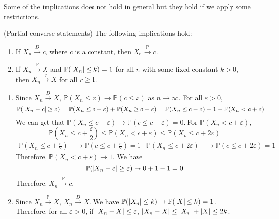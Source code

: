 \documentclass{huhtakm-template-book}
\newcommand{\prob}{\mathbb{P}}
\begin{document}
Some of the implications does not hold in general but they hold if we apply some restrictions.
\begin{thm}(Partial converse statements)
	\label{Chapter 8 (Theorem) Partial converse statements}
	The following implications hold:
	\begin{enumerate}
		\item If $X_{n}\xrightarrow{D}c$, where $c$ is a constant, then $X_{n}\xrightarrow{\prob}c$.
		\item If $X_{n}\xrightarrow{\prob}X$ and $\prob(\abs{X_{n}}\leq k)=1$ for all $n$ with some fixed constant $k>0$, then $X_{n}\xrightarrow{r}X$ for all $r\geq 1$.
	\end{enumerate}
\end{thm}
\begin{proofing}
	\begin{enumerate}
		\item Since $X_{n}\xrightarrow{D}X$, $\prob(X_{n}\leq x)\to\prob(c\leq x)$ as $n\to\infty$. For all $\varepsilon>0$,
		\begin{equation*}
			\prob(\abs{X_{n}-c}\geq\varepsilon)=\prob(X_{n}\leq c-\varepsilon)+\prob(X_{n}\geq c+\varepsilon)=\prob(X_{n}\leq c-\varepsilon)+1-\prob(X_{n}<c+\varepsilon)
		\end{equation*}
		We can get that $\prob(X_{n}\leq c-\varepsilon)\to\prob(c\leq c-\varepsilon)=0$. For $\prob(X_{n}<c+\varepsilon)$,
		\begin{equation*}
			\prob\left(X_{n}\leq c+\frac{\varepsilon}{2}\right)\leq\prob(X_{n}<c+\varepsilon)\leq\prob(X_{n}\leq c+2\varepsilon)
		\end{equation*}
		\begin{align*}
			\prob\left(X_{n}\leq c+\frac{\varepsilon}{2}\right)&\to\prob\left(c\leq c+\frac{\varepsilon}{2}\right)=1 & \prob(X_{n}\leq c+2\varepsilon)&\to\prob(c\leq c+2\varepsilon)=1
		\end{align*}
		Therefore, $\prob(X_{n}<c+\varepsilon)\to 1$. We have
		\begin{equation*}
			\prob(\abs{X_{n}-c}\geq\varepsilon)\to 0+1-1 = 0
		\end{equation*}
		Therefore, $X_{n}\xrightarrow{\prob}c$.
		\item Since $X_{n}\xrightarrow{\prob}X$, $X_{n}\xrightarrow{D}X$. We have $\prob(\abs{X_{n}}\leq k)\to\prob(\abs{X}\leq k)=1$.\\
		Therefore, for all $\varepsilon>0$, if $\left|{X_{n}-X}\right|\leq\varepsilon$, $\left|{X_{n}-X}\right|\leq\left|{X_{n}}\right|+\left|{X}\right|\leq 2k$.
		\begin{align*}

\end{align*}
\end{enumerate}
\end{proofing}
\end{document}
